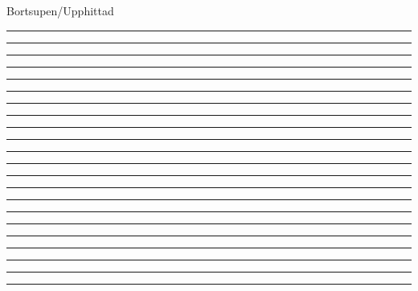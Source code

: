 
\thispagestyle{plainnohead}

\begin{center}
    {\normalfont\fontsize{12pt}{10pt}\selectfont{}Bortsupen/Upphittad}
    \vspace*{0.2cm}
    \rule{\textwidth}{0.0mm}
    \vspace*{0.65cm}
    \rule{5.5cm}{0.1mm}
    \vspace*{0.65cm}
    \rule{5.5cm}{0.2mm}
    \vspace*{0.65cm}
    \rule{5.5cm}{0.2mm}
    \vspace*{0.65cm}
    \rule{5.5cm}{0.2mm}
    \vspace*{0.65cm}
    \rule{5.5cm}{0.2mm}
    \vspace*{0.65cm}
    \rule{5.5cm}{0.2mm}
    \vspace*{0.65cm}
    \rule{5.5cm}{0.2mm}
    \vspace*{0.65cm}
    \rule{5.5cm}{0.2mm}
    \vspace*{0.65cm}
    \rule{5.5cm}{0.2mm}
    \vspace*{0.65cm}
    \rule{5.5cm}{0.2mm}
\end{center}

\newpage
\thispagestyle{plainnohead}


\begin{center}
    
    \phantom{\normalfont\normalsize\bfseries Bortsupen/Upphittad}
    \vspace*{0.2cm}
    \rule{\textwidth}{0.0mm}
    \vspace*{0.65cm}
    \rule{5.5cm}{0.1mm}
    \vspace*{0.65cm}
    \rule{5.5cm}{0.2mm}
    \vspace*{0.65cm}
    \rule{5.5cm}{0.2mm}
    \vspace*{0.65cm}
    \rule{5.5cm}{0.2mm}
    \vspace*{0.65cm}
    \rule{5.5cm}{0.2mm}
    \vspace*{0.65cm}
    \rule{5.5cm}{0.2mm}
    \vspace*{0.65cm}
    \rule{5.5cm}{0.2mm}
    \vspace*{0.65cm}
    \rule{5.5cm}{0.2mm}
    \vspace*{0.65cm}
    \rule{5.5cm}{0.2mm}
    \vspace*{0.65cm}
    \rule{5.5cm}{0.2mm}
\end{center}

